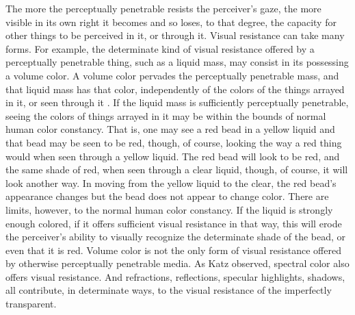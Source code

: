 The more the perceptually penetrable resists the perceiver's gaze, the more visible in its own right it becomes and so loses, to that degree, the capacity for other things to be perceived in it, or through it. Visual resistance can take many forms. For example, the determinate kind of visual resistance offered by a perceptually penetrable thing, such as a liquid mass, may consist in its possessing a volume color. A volume color pervades the perceptually penetrable mass, and that liquid mass has that color, independently of the colors of the things arrayed in it, or seen through it \citep[though see][]{Mizrahi:2010aa}. If the liquid mass is sufficiently perceptually penetrable, seeing the colors of things arrayed in it may be within the bounds of normal human color constancy. That is, one may see a red bead in a yellow liquid and that bead may be seen to be red, though, of course, looking the way a red thing would when seen through a yellow liquid. The red bead will look to be red, and the same shade of red, when seen through a clear liquid, though, of course, it will look another way. In moving from the yellow liquid to the clear, the red bead's appearance changes but the bead does not appear to change color. There are limits, however, to the normal human color constancy. If the liquid is strongly enough colored, if it offers sufficient visual resistance in that way, this will erode the perceiver's ability to visually recognize the determinate shade of the bead, or even that it is red. Volume color is not the only form of visual resistance offered by otherwise perceptually penetrable media. As Katz observed, spectral color also offers visual resistance. And refractions, reflections, specular highlights, shadows, all contribute, in determinate ways, to the visual resistance of the imperfectly transparent.

